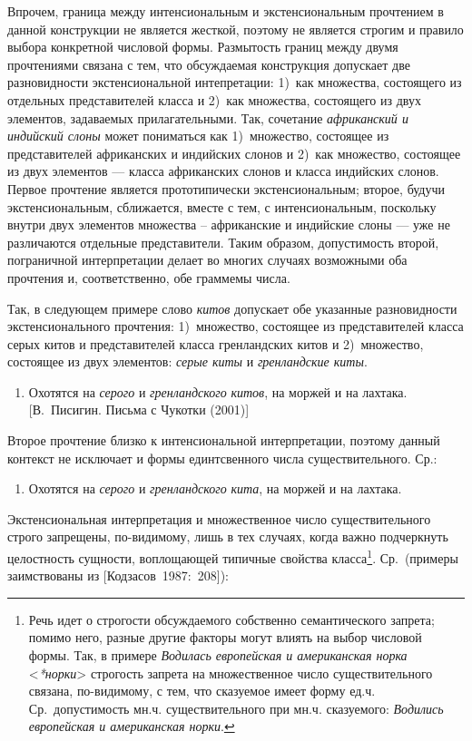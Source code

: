 Впрочем, граница между интенсиональным и экстенсиональным прочтением в
данной конструкции не является жесткой, поэтому не является строгим и
правило выбора конкретной числовой формы. Размытость границ между двумя
прочтениями связана с тем, что обсуждаемая конструкция допускает две
разновидности экстенсиональной интепретации: 1)~как множества,
состоящего из отдельных представителей класса и 2)~как множества,
состоящего из двух элементов, задаваемых прилагательными. Так, сочетание
\textit{африканский и индийский слоны} может пониматься как 1)~множество,
состоящее из представителей африканских и индийских слонов и 2)~как
множество, состоящее из двух элементов --- класса африканских слонов и
класса индийских слонов. Первое прочтение является прототипически
экстенсиональным; второе, будучи экстенсиональным, сближается, вместе с
тем, с интенсиональным, поскольку внутри двух элементов множества --
африканские и индийские слоны --- уже не различаются отдельные
представители. Таким образом, допустимость второй, пограничной
интерпретации делает во многих случаях возможными оба прочтения и,
соответственно, обе граммемы числа.

Так, в следующем примере слово \textit{китов} допускает обе указанные
разновидности экстенсионального прочтения: 1)~множество, состоящее из
представителей класса серых китов и представителей класса гренландских
китов и 2)~множество, состоящее из двух элементов: \textit{серые киты} и
\textit{гренландские киты}.

\begin{enumerate}
  \def\labelenumi{(\arabic{enumi})}
  \setcounter{enumi}{149}
  \item
        Охотятся на \textit{серого} и \textit{гренландского} \textit{китов}, на
        моржей и на лахтака. {[}В.~Писигин. Письма с Чукотки (2001){]}
\end{enumerate}

Второе прочтение близко к интенсиональной интерпретации, поэтому данный
контекст не исключает и формы единтсвенного числа существительного. Ср.:

\begin{enumerate}
  \def\labelenumi{(\arabic{enumi})}
  \setcounter{enumi}{150}
  \item
        Охотятся на \textit{серого} и \textit{гренландского} \textit{кита}, на
        моржей и на лахтака.
\end{enumerate}

Экстенсиональная интерпретация и множественное число существительного
строго запрещены, по-видимому, лишь в тех случаях, когда важно
подчеркнуть целостность сущности, воплощающей типичные свойства
класса\footnote{Речь идет о строгости обсуждаемого собственно
  семантического запрета; помимо него, разные другие факторы могут
  влиять на выбор числовой формы. Так, в примере \textit{Водилась
    европейская и американская норка}
  \textless{}\textit{*норки}\textgreater{} строгость запрета на
  множественное число существительного связана, по-видимому, с тем, что
  сказуемое имеет форму ед.ч. Ср.~допустимость мн.ч. существительного
  при мн.ч. сказуемого: \textit{Водились европейская и американская
    норки}.}. Ср.~(примеры заимствованы из {[}Кодзасов~1987:~208{]}):

